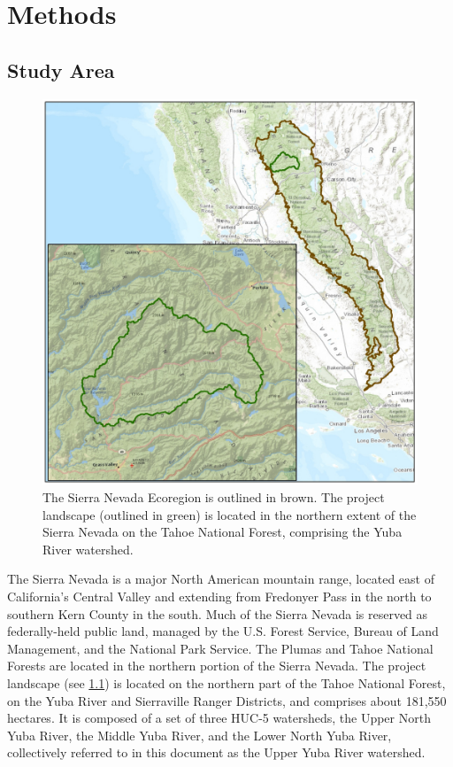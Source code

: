 \chapter{Methods}
\section{Study Area}
\begin{figure}
\includegraphics[width=\textwidth]{images/ecoregionprojectarea.jpg}
\caption{The Sierra Nevada Ecoregion is outlined in brown. The project landscape (outlined in green) is located in the northern extent of the Sierra Nevada on the Tahoe National Forest, comprising the Yuba River watershed.}
\label{projectarea}
\end{figure}
The Sierra Nevada is a major North American mountain range, located east of California's Central Valley and extending from Fredonyer Pass in the north to southern Kern County in the south. Much of the Sierra Nevada is reserved as federally-held public land, managed by the U.S. Forest Service, Bureau of Land Management, and the National Park Service. The Plumas and Tahoe National Forests are located in the northern portion of the Sierra Nevada. The project landscape (see \ref{projectarea}) is located on the northern part of the Tahoe National Forest, on the Yuba River and Sierraville Ranger Districts, and comprises about 181,550 hectares. It is composed of a set of three HUC-5 watersheds, the Upper North Yuba River, the Middle Yuba River, and the Lower North Yuba River, collectively referred to in this document as the Upper Yuba River watershed. 

